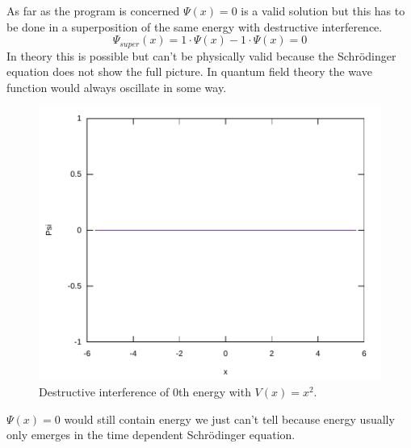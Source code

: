 \documentclass[11pt,DIV=10,final]{scrreprt} %
\begin{document}
\begin{minipage}{\textwidth}
As far as the program is concerned $\Psi(x) = 0$ is a valid solution but this has to be done
in a superposition of the same energy with destructive interference.
\[
  \Psi_{super}(x) = 1 \cdot \Psi(x) - 1 \cdot \Psi(x) = 0
\]
In theory this is possible but can't be physically valid because the Schrödinger equation
does not show the full picture. In quantum field theory the wave function would always
oscillate in some way.
\begin{figure}[H]
  \centering
  \includegraphics[width=\textwidth]{plots/super-square-0-0-destructive.pdf}
  \caption{Destructive interference of 0th energy with $V(x) = x^{2}$.}
\end{figure}

$\Psi(x) = 0$ would still contain energy we just can't tell because energy usually only
emerges in the time dependent Schrödinger equation.
\end{minipage}
\end{document}
